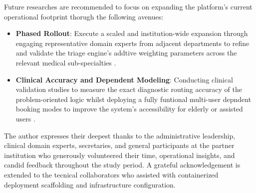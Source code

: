 \documentclass[manuscript, screen, review]{acmart}
\begin{document}
Future researches are recommended to focus on expanding the platform's current operational footprint thorugh the following avenues: 
\begin{itemize}
  \item \textbf{Phased Rollout}: Execute a scaled and institution-wide expansion through engaging representative domain experts from adjacent departments to refine and validate the triage engine's addtive weighting parameters across the relevant medical sub-specialties \cite{friedman1991pomd,siriban2026}. 
  \item \textbf{Clinical Accuracy and Dependent Modeling}: Conducting clinical validation studies to measure the exact diagnostic routing accuracy of the problem-oriented logic whilst deploying a fully funtional multi-user depndent booking modes to improve the system's accessibility for elderly or assisted users \cite{friedman1991pomd,siriban2026}. 
\end{itemize}

\begin{acks}
  The author expresses their deepest thanks to the administrative leadership, clinical domain experts, secretaries, and general participants at the partner institution who generously volunteered their time, operational insights, and candid feedback throughout the study period. A grateful acknowledgement is extended to the tecnical collaborators who assisted with containerized deployment scaffolding and infrastructure configuration.
\end{acks}



\end{document}
